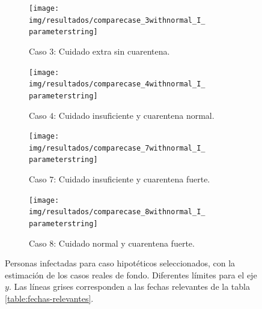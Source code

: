 
\begin{figure}[H]
     \centering
     \begin{subfigure}[b]{.47\textwidth}
         \centering
         \texttt{[image: img/resultados/comparecase\_3withnormal\_I\_\\parameterstring]}
         \caption{Caso \(3\): Cuidado extra sin cuarentena.}
         \label{img:esc-beta-grande-c3}
     \end{subfigure}
     \hfill
     \begin{subfigure}[b]{.47\textwidth}
         \centering
         \texttt{[image: img/resultados/comparecase\_4withnormal\_I\_\\parameterstring]}
         \caption{Caso \(4\): Cuidado insuficiente y cuarentena normal.}
         \label{img:esc-beta-grande-c4}
     \end{subfigure}
     \hfill
     \begin{subfigure}[b]{.47\textwidth}
         \centering
         \texttt{[image: img/resultados/comparecase\_7withnormal\_I\_\\parameterstring]}
         \caption{Caso \(7\): Cuidado insuficiente y cuarentena fuerte.}
         \label{img:esc-beta-grande-c7}
     \end{subfigure}
     \hfill
     \begin{subfigure}[b]{.47\textwidth}
         \centering
         \texttt{[image: img/resultados/comparecase\_8withnormal\_I\_\\parameterstring]}
         \caption{Caso \(8\): Cuidado normal y cuarentena fuerte.}
         \label{img:esc-beta-grande-c8}
     \end{subfigure}
     \hfill 
    \begin{subfigure}[b]{0.99\textwidth}
    \centering
    \scalebox{0.7}{
    
    }
    \end{subfigure}
        \caption[Personas infectadas para casos hipotéticos seleccionados. Escenario \(\beta_{\text{exterior}} >> 1\).]{Personas infectadas para caso hipotéticos seleccionados, con la estimación de los casos reales de fondo. Diferentes límites para el eje \(y\). Las líneas grises corresponden a las fechas relevantes de la tabla \ref{table:fechas-relevantes}.}
        \label{img:hip-3478-I-comp}
\end{figure}


